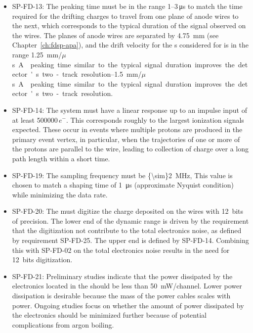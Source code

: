 \pagebreak


\begin{itemize}
\item SP-FD-13: The  peaking time must be in the range \numrange{1}{3}\,\si{\micro\second} 
to match the time required for the drifting charges to travel from one plane of anode
wires to the next, which corresponds to the typical duration of the signal observed
on the wires. The planes of anode wires are separated by \SI{4.75}{mm} 
(see Chapter~\ref{ch:fdsp-apa}), and the drift velocity for the \efield{}s 
considered for  is in the range \SIrange{1.25}{1.5}{mm/$\mu$s}. 
A  peaking time  similar to the typical signal duration improves the 
detector's two-track resolution.  

\item SP-FD-14: The system must have a linear response up to an impulse input of 
at least \num{500000}\,$e^{-}$.  This corresponds roughly to the largest 
ionization signals expected. These occur in events where multiple protons are produced 
in the primary event vertex, in particular, when the trajectories of one 
or more of the protons are parallel to the wire, 
leading to collection of charge over a long path length within a short time.

\item SP-FD-19:  The  sampling frequency must be \SI{{\sim}2}{MHz},
This value is chosen to match a  shaping time of \SI{1}{\micro\second} 
(approximate Nyquist condition) while minimizing the data rate.

\item SP-FD-20: The  must digitize the charge deposited on the wires 
with 12~bits of precision.  The lower end of the  dynamic 
range is driven by the requirement that the digitization not contribute 
to the total electronics noise, as defined by requirement SP-FD-25. The upper end
is defined by SP-FD-14. Combining this with SP-FD-02 on the total electronics noise 
results in the need for 12~bits digitization. 

\item SP-FD-21: Preliminary studies indicate that the power dissipated by the 
electronics located in the  should be less than \SI{50}{mW/channel}. 
Lower power dissipation is desirable because the mass of the power cables scales 
with power. Ongoing studies focus on whether the amount of power dissipated by 
the electronics should be minimized further because of potential complications from 
argon boiling. 


\end{itemize}
